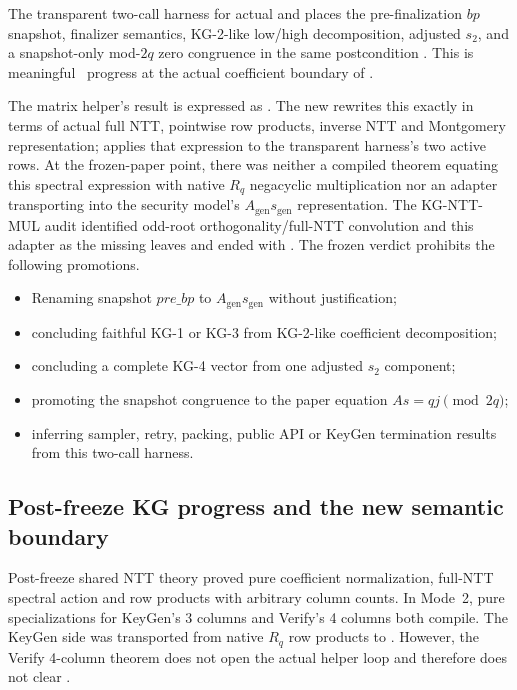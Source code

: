 The transparent two-call harness for actual  and
 places the pre-finalization \(bp\) snapshot,
finalizer semantics, KG-2-like low/high decomposition, adjusted \(s_2\), and a
snapshot-only mod-\(2q\) zero congruence in the same postcondition
\cite{week16-mincore-plan,week16-kg-report,week16-kg-ntt-mul-report}. This is
meaningful \statuspartial\ progress at the actual coefficient boundary of
.

The matrix helper's result is expressed as
. The new
 rewrites this exactly in terms of
actual full NTT, pointwise row products, inverse NTT and Montgomery representation;
 applies that expression
to the transparent harness's two active rows.
At the frozen-paper point, there was neither a compiled theorem equating this
spectral expression with native \(R_q\) negacyclic multiplication nor an adapter
transporting  into the security model's
\(A_{\mathrm{gen}}s_{\mathrm{gen}}\) representation. The KG-NTT-MUL audit
identified odd-root orthogonality/full-NTT convolution and this adapter as the
missing leaves and ended with . The frozen verdict
prohibits the following promotions.

\begin{itemize}
  \item Renaming snapshot \(\mathit{pre\_bp}\) to
        \(A_{\mathrm{gen}}s_{\mathrm{gen}}\) without justification;
  \item concluding faithful KG-1 or KG-3 from KG-2-like coefficient decomposition;
  \item concluding a complete KG-4 vector from one adjusted \(s_2\) component;
  \item promoting the snapshot congruence to the paper equation \(A s=qj\pmod{2q}\);
  \item inferring sampler, retry, packing, public API or KeyGen termination
        results from this two-call harness.
\end{itemize}

\subsection{Post-freeze KG progress and the new semantic boundary}

Post-freeze shared NTT theory proved pure coefficient normalization, full-NTT
spectral action and row products with arbitrary column counts. In Mode~2, pure
specializations for KeyGen's 3 columns and Verify's 4 columns both compile.
The KeyGen side was transported from native \(R_q\) row products to
\cite{post-freeze-kg-rq-haetae-report}. However, the Verify 4-column theorem does
not open the actual helper loop and therefore does not clear \FrozenPaperGate.

